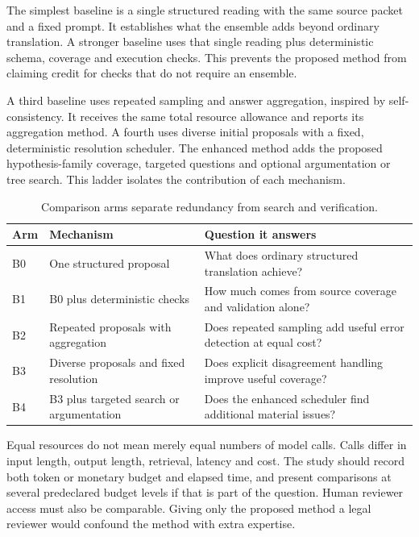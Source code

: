 The simplest baseline is a single structured reading with the same source packet
and a fixed prompt. It establishes what the ensemble adds beyond ordinary
translation. A stronger baseline uses that single reading plus deterministic
schema, coverage and execution checks. This prevents the proposed method from
claiming credit for checks that do not require an ensemble.

A third baseline uses repeated sampling and answer aggregation, inspired by
self-consistency. It receives the same total resource allowance and reports its
aggregation method. A fourth uses diverse initial proposals with a fixed,
deterministic resolution scheduler. The enhanced method adds the proposed
hypothesis-family coverage, targeted questions and optional argumentation or tree
search. This ladder isolates the contribution of each mechanism.

\begin{table}[htbp]
\centering\small
\caption{Comparison arms separate redundancy from search and verification.}
\begin{tabularx}{\textwidth}{P{16mm}YY}
\toprule
Arm & Mechanism & Question it answers\\
\midrule
B0 & One structured proposal & What does ordinary structured translation achieve?\\
B1 & B0 plus deterministic checks & How much comes from source coverage and validation alone?\\
B2 & Repeated proposals with aggregation & Does repeated sampling add useful error detection at equal cost?\\
B3 & Diverse proposals and fixed resolution & Does explicit disagreement handling improve useful coverage?\\
B4 & B3 plus targeted search or argumentation & Does the enhanced scheduler find additional material issues?\\
\bottomrule
\end{tabularx}
\end{table}


Equal resources do not mean merely equal numbers of model calls. Calls differ in
input length, output length, retrieval, latency and cost. The study should record
both token or monetary budget and elapsed time, and present comparisons at
several predeclared budget levels if that is part of the question. Human reviewer
access must also be comparable. Giving only the proposed method a legal reviewer
would confound the method with extra expertise.

